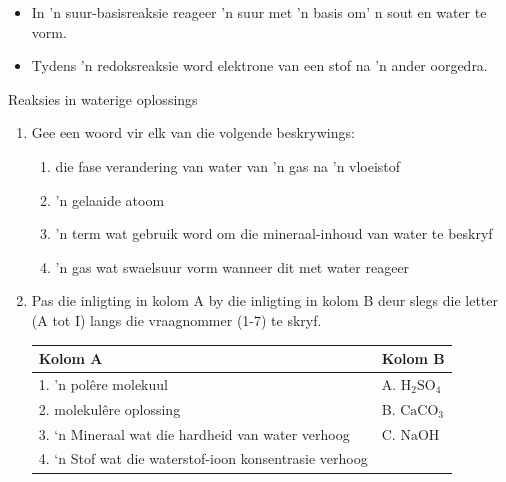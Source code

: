 {{\begin{itemize}[noitemsep]
\label{m38719*id813}\item In 'n suur-basisreaksie reageer 'n suur met 'n basis om' n sout en water te vorm.
\label{m38719*uid823}\item Tydens 'n redoksreaksie word elektrone van een stof na 'n ander oorgedra. 
\end{itemize}
\label{m38719*eip-896}
            \begin{eocexercises}{Reaksies in waterige oplossings}
            \nopagebreak
            \label{m38719*id342869}\begin{enumerate}[noitemsep, label=\textbf{\arabic*}. ] 
            \label{m38719*uid107}\item Gee een woord vir elk van die volgende beskrywings:
\label{m38719*id342885}\begin{enumerate}[noitemsep, label=\textbf{\alph*}. ] 
            \label{m38719*uid108}\item die fase verandering van water van 'n gas na 'n vloeistof
\label{m38719*uid109}\item 'n gelaaide atoom
\label{m38719*uid110}\item 'n term wat gebruik word om die mineraal-inhoud van water te beskryf
\label{m38719*uid111}\item 'n gas wat swaelsuur vorm wanneer dit met water reageer
\end{enumerate}
\label{m38719*uid112}\item Pas die inligting in kolom A by die inligting in kolom B deur slegs die letter (A tot I) langs die vraagnommer (1-7) te skryf.
          \begin{table}[H]
        \begin{center}
      \label{m38719*id342952}
    \noindent
      \begin{tabular}{|l|l|}\hline
        \textbf{Kolom A} &
        \textbf{Kolom B} \\ \hline
        1. 'n pol\^{e}re molekuul &
        A. ${\text{H}}_{2}{\text{SO}}_{4}$ \\ \hline
        2. molekul\^{e}re oplossing &
        B. ${\text{CaCO}}_{3}$ \\ \hline
        3. ‘n Mineraal wat die hardheid van water verhoog &
        C. $\text{NaOH}$ \\ \hline
        4.  ‘n Stof wat die waterstof-ioon konsentrasie verhoog &

\end{tabular}
\end{center}
\end{table}
\end{enumerate}
\end{eocexercises}}}
